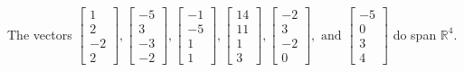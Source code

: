 \begin{exercise}
\begin{exerciseStatement}
  \end{exerciseStatement}
  \begin{exerciseAnswer}
   The vectors \(\left[\begin{array}{r}
1 \\
2 \\
-2 \\
2
\end{array}\right] , \left[\begin{array}{r}
-5 \\
3 \\
-3 \\
-2
\end{array}\right] , \left[\begin{array}{r}
-1 \\
-5 \\
1 \\
1
\end{array}\right] , \left[\begin{array}{r}
14 \\
11 \\
1 \\
3
\end{array}\right] , \left[\begin{array}{r}
-2 \\
3 \\
-2 \\
0
\end{array}\right] , \text{ and } \left[\begin{array}{r}
-5 \\
0 \\
3 \\
4
\end{array}\right]\) 
  	 do  
	span \(\mathbb{R}^4\).
  


  \end{exerciseAnswer}
\end{exercise}